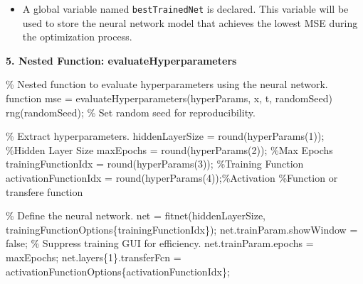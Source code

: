 \documentclass[
  super,
  review,
  3p]{elsarticle}
\newenvironment{Shaded}{\begin{snugshade}}{\end{snugshade}}
\newcommand{\CommentTok}[1]{\textcolor[rgb]{0.37,0.37,0.37}{#1}}
\newcommand{\FloatTok}[1]{\textcolor[rgb]{0.68,0.00,0.00}{#1}}
\newcommand{\KeywordTok}[1]{\textcolor[rgb]{0.00,0.23,0.31}{#1}}
\newcommand{\NormalTok}[1]{\textcolor[rgb]{0.00,0.23,0.31}{#1}}
\newcommand{\OperatorTok}[1]{\textcolor[rgb]{0.37,0.37,0.37}{#1}}
\newcommand{\VariableTok}[1]{\textcolor[rgb]{0.07,0.07,0.07}{#1}}
\providecommand{\tightlist}{%
  \setlength{\itemsep}{0pt}\setlength{\parskip}{0pt}}\usepackage{longtable,booktabs,array}
\begin{document}
\begin{itemize}
\tightlist
\item
  A global variable named \texttt{bestTrainedNet} is declared. This
  variable will be used to store the neural network model that achieves
  the lowest MSE during the optimization process.
\end{itemize}

\textbf{5. Nested Function: evaluateHyperparameters}

\begin{Shaded}
\begin{Highlighting}[]
\CommentTok{\% Nested function to evaluate hyperparameters using the neural network.}
    \KeywordTok{function} \VariableTok{mse} \OperatorTok{=} \VariableTok{evaluateHyperparameters}\NormalTok{(}\VariableTok{hyperParams}\OperatorTok{,} \VariableTok{x}\OperatorTok{,} \VariableTok{t}\OperatorTok{,} \VariableTok{randomSeed}\NormalTok{)}
        \VariableTok{rng}\NormalTok{(}\VariableTok{randomSeed}\NormalTok{)}\OperatorTok{;} \CommentTok{\% Set random seed for reproducibility.}

        \CommentTok{\% Extract hyperparameters.}
        \VariableTok{hiddenLayerSize} \OperatorTok{=} \VariableTok{round}\NormalTok{(}\VariableTok{hyperParams}\NormalTok{(}\FloatTok{1}\NormalTok{))}\OperatorTok{;} \CommentTok{\%Hidden Layer Size}
        \VariableTok{maxEpochs} \OperatorTok{=} \VariableTok{round}\NormalTok{(}\VariableTok{hyperParams}\NormalTok{(}\FloatTok{2}\NormalTok{))}\OperatorTok{;}       \CommentTok{\%Max Epochs}
        \VariableTok{trainingFunctionIdx} \OperatorTok{=} \VariableTok{round}\NormalTok{(}\VariableTok{hyperParams}\NormalTok{(}\FloatTok{3}\NormalTok{))}\OperatorTok{;} \CommentTok{\%Training Function}
        \VariableTok{activationFunctionIdx} \OperatorTok{=} \VariableTok{round}\NormalTok{(}\VariableTok{hyperParams}\NormalTok{(}\FloatTok{4}\NormalTok{))}\OperatorTok{;}\CommentTok{\%Activation }
        \CommentTok{\%Function or transfere function}

        \CommentTok{\% Define the neural network.}
        \VariableTok{net} \OperatorTok{=} \VariableTok{fitnet}\NormalTok{(}\VariableTok{hiddenLayerSize}\OperatorTok{,} \VariableTok{trainingFunctionOptions}\NormalTok{\{}\VariableTok{trainingFunctionIdx}\NormalTok{\})}\OperatorTok{;}
        \VariableTok{net}\NormalTok{.}\VariableTok{trainParam}\NormalTok{.}\VariableTok{showWindow} \OperatorTok{=} \VariableTok{false}\OperatorTok{;} \CommentTok{\% Suppress training GUI for efficiency.}
        \VariableTok{net}\NormalTok{.}\VariableTok{trainParam}\NormalTok{.}\VariableTok{epochs} \OperatorTok{=} \VariableTok{maxEpochs}\OperatorTok{;}
        \VariableTok{net}\NormalTok{.}\VariableTok{layers}\NormalTok{\{}\FloatTok{1}\NormalTok{\}.}\VariableTok{transferFcn} \OperatorTok{=} \VariableTok{activationFunctionOptions}\NormalTok{\{}\VariableTok{activationFunctionIdx}\NormalTok{\}}\OperatorTok{;}


\end{Highlighting}
\end{Shaded}
\end{document}

